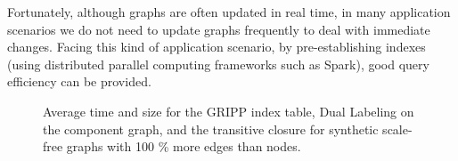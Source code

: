 \documentclass[11pt]{article}
\begin{document}
Fortunately, although graphs are often updated in real time, in many application scenarios we do not need to update graphs frequently to deal with immediate changes.  Facing this kind of application scenario, by pre-establishing indexes (using distributed parallel computing frameworks such as Spark), good query efficiency can be provided.
\begin{figure}[H]
\centering
{}
\caption{Average time and size for the GRIPP index table, Dual Labeling on the component graph, and the transitive closure for synthetic scale-free graphs with 100 \% more edges than nodes.\cite{ref4}}
\end{figure}
\end{document}
